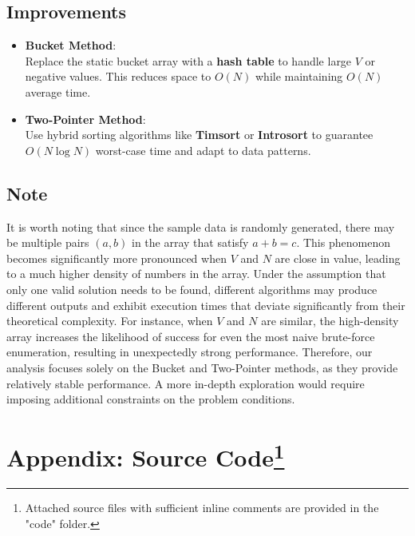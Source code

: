 \documentclass{report}
\begin{document}
\section*{Improvements}
\begin{itemize}
    \item \textbf{Bucket Method}:\\
        Replace the static bucket array with a \textbf{hash table} to handle large \(V\) or negative values. This reduces space to \(O(N)\) while maintaining \(O(N)\) average time.  
    
    \item \textbf{Two-Pointer Method}:\\
        Use hybrid sorting algorithms like \textbf{Timsort} or \textbf{Introsort} to guarantee \(O(N \log N)\) worst-case time and adapt to data patterns.
\end{itemize}

\section*{Note}

It is worth noting that since the sample data is randomly generated, there may be multiple pairs \( (a, b) \) in the array that satisfy \( a + b = c \). This phenomenon becomes significantly more pronounced when \( V \) and \( N \) are close in value, leading to a much higher density of numbers in the array. Under the assumption that only one valid solution needs to be found, different algorithms may produce different outputs and exhibit execution times that deviate significantly from their theoretical complexity. For instance, when \( V \) and \( N \) are similar, the high-density array increases the likelihood of success for even the most naive brute-force enumeration, resulting in unexpectedly strong performance. Therefore, our analysis focuses solely on the Bucket and Two-Pointer methods, as they provide relatively stable performance. A more in-depth exploration would require imposing additional constraints on the problem conditions.

\chapter*{Appendix: Source Code\footnote{Attached source files with sufficient inline comments are provided in the "code" folder.}}
\end{document}
